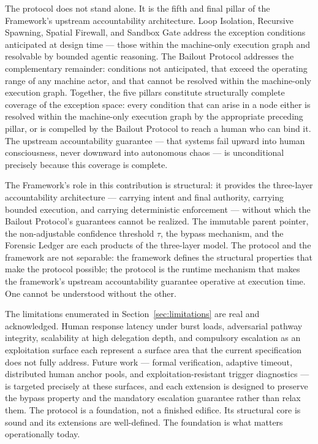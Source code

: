The protocol does not stand alone.  It is the fifth and final pillar of the \bxthree{} Framework's upstream accountability architecture.  Loop Isolation, Recursive Spawning, Spatial Firewall, and Sandbox Gate address the exception conditions anticipated at design time --- those within the machine-only execution graph and resolvable by bounded agentic reasoning.  The Bailout Protocol addresses the complementary remainder: conditions not anticipated, that exceed the operating range of any machine actor, and that cannot be resolved within the machine-only execution graph.  Together, the five pillars constitute structurally complete coverage of the exception space: every condition that can arise in a \bxthree{} node either is resolved within the machine-only execution graph by the appropriate preceding pillar, or is compelled by the Bailout Protocol to reach a human who can bind it.  The upstream accountability guarantee --- that \bxthree{} systems fail upward into human consciousness, never downward into autonomous chaos --- is unconditional precisely because this coverage is complete.

The \bxthree{} Framework's role in this contribution is structural: it provides the three-layer accountability architecture --- \purpose{} carrying intent and final authority, \bounds{} carrying bounded execution, and \fact{} carrying deterministic enforcement --- without which the Bailout Protocol's guarantees cannot be realized.  The immutable parent pointer, the non-adjustable confidence threshold $\tau$, the bypass mechanism, and the Forensic Ledger are each products of the three-layer model.  The protocol and the framework are not separable: the framework defines the structural properties that make the protocol possible; the protocol is the runtime mechanism that makes the framework's upstream accountability guarantee operative at execution time.  One cannot be understood without the other.

The limitations enumerated in Section~\ref{sec:limitations} are real and acknowledged.  Human response latency under burst loads, adversarial pathway integrity, scalability at high delegation depth, and compulsory escalation as an exploitation surface each represent a surface area that the current specification does not fully address.  Future work --- formal verification, adaptive timeout, distributed human anchor pools, and exploitation-resistant trigger diagnostics --- is targeted precisely at these surfaces, and each extension is designed to preserve the bypass property and the mandatory escalation guarantee rather than relax them.  The protocol is a foundation, not a finished edifice.  Its structural core is sound and its extensions are well-defined.  The foundation is what matters operationally today.
